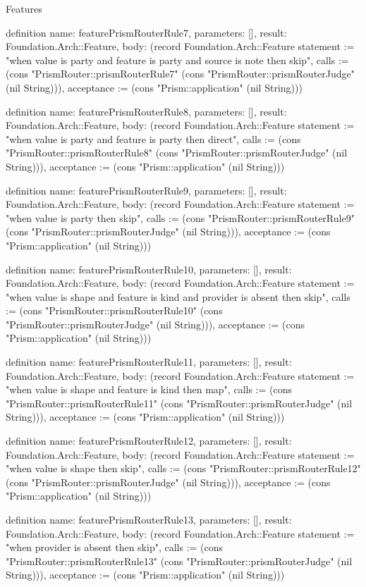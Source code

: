 \begin{lexlean}{Features}
\begin{semanticmodule}
definition{
  name: featurePrismRouterRule7,
  parameters: [],
  result: Foundation.Arch::Feature,
  body: (record Foundation.Arch::Feature {statement := "when value is party and feature is party and source is note then skip", calls := (cons "PrismRouter::prismRouterRule7" (cons "PrismRouter::prismRouterJudge" (nil String))), acceptance := (cons "Prism::application" (nil String))})
}

definition{
  name: featurePrismRouterRule8,
  parameters: [],
  result: Foundation.Arch::Feature,
  body: (record Foundation.Arch::Feature {statement := "when value is party and feature is party then direct", calls := (cons "PrismRouter::prismRouterRule8" (cons "PrismRouter::prismRouterJudge" (nil String))), acceptance := (cons "Prism::application" (nil String))})
}

definition{
  name: featurePrismRouterRule9,
  parameters: [],
  result: Foundation.Arch::Feature,
  body: (record Foundation.Arch::Feature {statement := "when value is party then skip", calls := (cons "PrismRouter::prismRouterRule9" (cons "PrismRouter::prismRouterJudge" (nil String))), acceptance := (cons "Prism::application" (nil String))})
}

definition{
  name: featurePrismRouterRule10,
  parameters: [],
  result: Foundation.Arch::Feature,
  body: (record Foundation.Arch::Feature {statement := "when value is shape and feature is kind and provider is absent then skip", calls := (cons "PrismRouter::prismRouterRule10" (cons "PrismRouter::prismRouterJudge" (nil String))), acceptance := (cons "Prism::application" (nil String))})
}

definition{
  name: featurePrismRouterRule11,
  parameters: [],
  result: Foundation.Arch::Feature,
  body: (record Foundation.Arch::Feature {statement := "when value is shape and feature is kind then map", calls := (cons "PrismRouter::prismRouterRule11" (cons "PrismRouter::prismRouterJudge" (nil String))), acceptance := (cons "Prism::application" (nil String))})
}

definition{
  name: featurePrismRouterRule12,
  parameters: [],
  result: Foundation.Arch::Feature,
  body: (record Foundation.Arch::Feature {statement := "when value is shape then skip", calls := (cons "PrismRouter::prismRouterRule12" (cons "PrismRouter::prismRouterJudge" (nil String))), acceptance := (cons "Prism::application" (nil String))})
}

definition{
  name: featurePrismRouterRule13,
  parameters: [],
  result: Foundation.Arch::Feature,
  body: (record Foundation.Arch::Feature {statement := "when provider is absent then skip", calls := (cons "PrismRouter::prismRouterRule13" (cons "PrismRouter::prismRouterJudge" (nil String))), acceptance := (cons "Prism::application" (nil String))})
}


\end{semanticmodule}
\end{lexlean}
